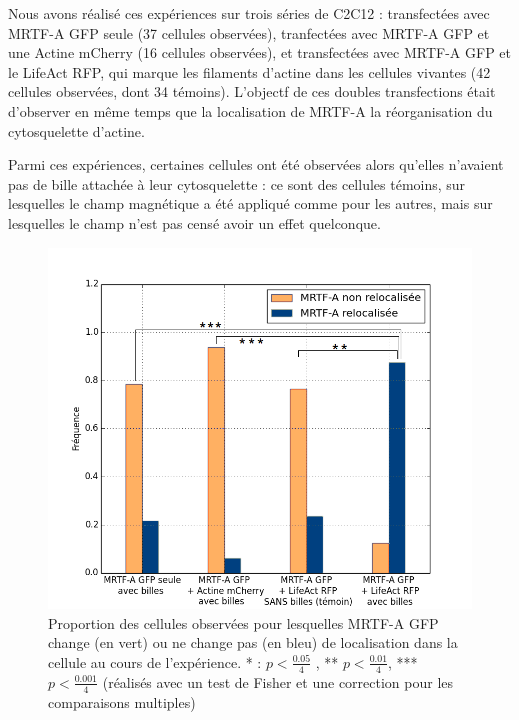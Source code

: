 \documentclass{report}
\begin{document}
Nous avons réalisé ces expériences sur trois séries de C2C12 : transfectées avec MRTF-A GFP seule (37 cellules observées), tranfectées avec MRTF-A GFP et une Actine mCherry (16 cellules observées), et transfectées avec MRTF-A GFP et le LifeAct RFP, qui marque les filaments d'actine dans les cellules vivantes (42 cellules observées, dont 34 témoins). 
L'objectf de ces doubles transfections était d'observer en même temps que la localisation de MRTF-A la réorganisation du cytosquelette d'actine. 

Parmi ces expériences, certaines cellules ont été observées alors qu'elles n'avaient pas de bille attachée à leur cytosquelette : ce sont des cellules témoins, sur lesquelles le champ magnétique a été appliqué comme pour les autres, mais sur lesquelles le champ n'est pas censé avoir un effet quelconque. 

\begin{figure}
\includegraphics[scale=0.4]{Figures/Pinces_MRTFA_stars_colors.png} 
\caption{Proportion des cellules observées pour lesquelles MRTF-A GFP change (en vert) ou ne change pas (en bleu) de localisation dans la cellule au cours de l'expérience. * : $p<\frac{0.05}{4}$ , ** $p<\frac{0.01}{4}$, *** $p<\frac{0.001}{4}$ (réalisés avec un test de Fisher et une correction pour les comparaisons multiples)\label{MRTF-A Pinces}}
\end{figure}
\end{document}
